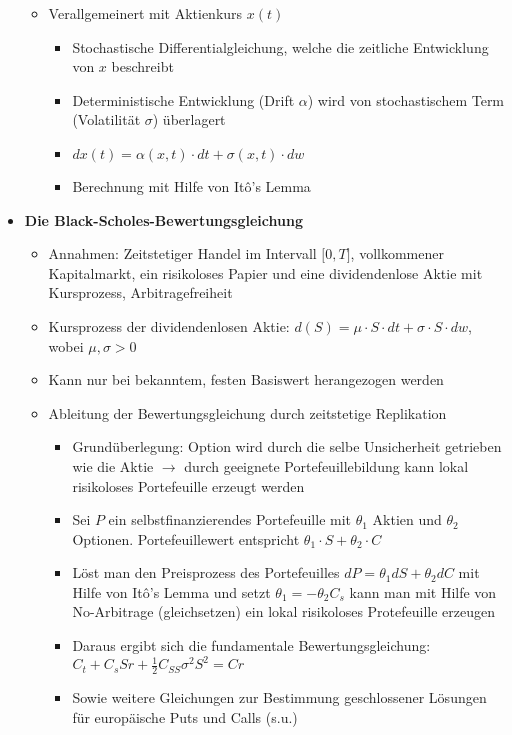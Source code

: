 \begin{itemize}
\begin{itemize}
		\item Verallgemeinert mit Aktienkurs \(x(t)\)
		\begin{itemize}
			\item Stochastische Differentialgleichung, welche die zeitliche Entwicklung von \(x\) beschreibt
			\item Deterministische Entwicklung (Drift \(\alpha\)) wird von stochastischem Term (Volatilität \(\sigma\)) überlagert
			\item \(dx(t) = \alpha(x,t)\cdot dt + \sigma(x,t)\cdot dw\)
			\item Berechnung mit Hilfe von Itô's Lemma
		\end{itemize}
	\end{itemize}
	\item \textbf{Die Black-Scholes-Bewertungsgleichung}
	\begin{itemize}
		\item Annahmen: Zeitstetiger Handel im Intervall \(\lbrack 0,T\rbrack\), vollkommener Kapitalmarkt, ein risikoloses Papier und eine dividendenlose Aktie mit Kursprozess, Arbitragefreiheit
		\item Kursprozess der dividendenlosen Aktie: \(d(S) = \mu \cdot S \cdot dt + \sigma \cdot S \cdot dw\), wobei \(\mu,\sigma > 0\)
		\item Kann nur bei bekanntem, festen Basiswert herangezogen werden
		\item Ableitung der Bewertungsgleichung durch zeitstetige Replikation
		\begin{itemize}
			\item Grundüberlegung: Option wird durch die selbe Unsicherheit getrieben wie die Aktie \(\rightarrow\) durch geeignete Portefeuillebildung kann lokal risikoloses Portefeuille erzeugt werden
			\item Sei \(P\) ein selbstfinanzierendes Portefeuille mit \(\theta_1\) Aktien und \(\theta_2\) Optionen. Portefeuillewert entspricht \(\theta_1 \cdot S + \theta_2 \cdot C\)
			\item Löst man den Preisprozess des Portefeuilles \(dP = \theta_1dS + \theta_2dC\) mit Hilfe von Itô's Lemma und setzt \(\theta_1 = -\theta_2C_s\) kann man mit Hilfe von No-Arbitrage (gleichsetzen) ein lokal risikoloses Protefeuille erzeugen
			\item Daraus ergibt sich die fundamentale Bewertungsgleichung: \(C_t + C_sSr + \frac{1}{2}C_{SS}\sigma^2S^2 = Cr\)
			\item Sowie weitere Gleichungen zur Bestimmung geschlossener Lösungen für europäische Puts und Calls (s.u.)
		\end{itemize}
	\end{itemize}
\end{itemize}



